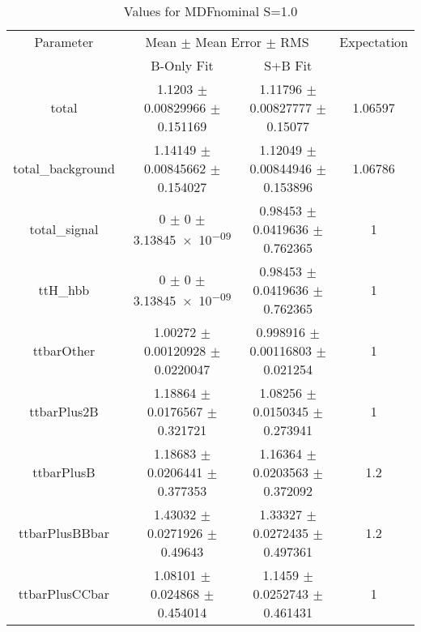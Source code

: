 \begin{table}
\centering
\caption{Values for MDFnominal S=1.0}
\begin{tabular}{cccc}
\toprule
Parameter & \multicolumn{2}{c}{Mean $\pm$ Mean Error $\pm$ RMS} & Expectation\\
 & B-Only Fit & S+B Fit & \\
\midrule
total & \num{1.1203} $\pm$ \num{0.00829966} $\pm$ \num{0.151169} & \num{1.11796} $\pm$ \num{0.00827777} $\pm$ \num{0.15077} & \num{1.06597}\\
total\_background & \num{1.14149} $\pm$ \num{0.00845662} $\pm$ \num{0.154027} & \num{1.12049} $\pm$ \num{0.00844946} $\pm$ \num{0.153896} & \num{1.06786}\\
total\_signal & \num{0} $\pm$ \num{0} $\pm$ \num{3.13845e-09} & \num{0.98453} $\pm$ \num{0.0419636} $\pm$ \num{0.762365} & \num{1}\\
ttH\_hbb & \num{0} $\pm$ \num{0} $\pm$ \num{3.13845e-09} & \num{0.98453} $\pm$ \num{0.0419636} $\pm$ \num{0.762365} & \num{1}\\
ttbarOther & \num{1.00272} $\pm$ \num{0.00120928} $\pm$ \num{0.0220047} & \num{0.998916} $\pm$ \num{0.00116803} $\pm$ \num{0.021254} & \num{1}\\
ttbarPlus2B & \num{1.18864} $\pm$ \num{0.0176567} $\pm$ \num{0.321721} & \num{1.08256} $\pm$ \num{0.0150345} $\pm$ \num{0.273941} & \num{1}\\
ttbarPlusB & \num{1.18683} $\pm$ \num{0.0206441} $\pm$ \num{0.377353} & \num{1.16364} $\pm$ \num{0.0203563} $\pm$ \num{0.372092} & \num{1.2}\\
ttbarPlusBBbar & \num{1.43032} $\pm$ \num{0.0271926} $\pm$ \num{0.49643} & \num{1.33327} $\pm$ \num{0.0272435} $\pm$ \num{0.497361} & \num{1.2}\\
ttbarPlusCCbar & \num{1.08101} $\pm$ \num{0.024868} $\pm$ \num{0.454014} & \num{1.1459} $\pm$ \num{0.0252743} $\pm$ \num{0.461431} & \num{1}\\
\bottomrule
\end{tabular}
\end{table}